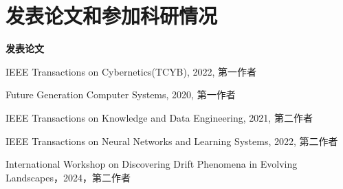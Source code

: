 

\chapter*{发表论文和参加科研情况}
%
%
%
%
%
%
\setlength{\parindent}{0em}
\textbf{发表论文}
\begin{publist}
    \item IEEE Transactions on Cybernetics(TCYB), 2022, 第一作者
    \item Future Generation Computer Systems, 2020, 第一作者
    \item IEEE Transactions on Knowledge and Data Engineering, 2021, 第二作者
    \item IEEE Transactions on Neural Networks and Learning Systems, 2022, 第二作者
    \item International Workshop on Discovering Drift Phenomena in Evolving Landscapes，2024，第二作者
\end{publist}

